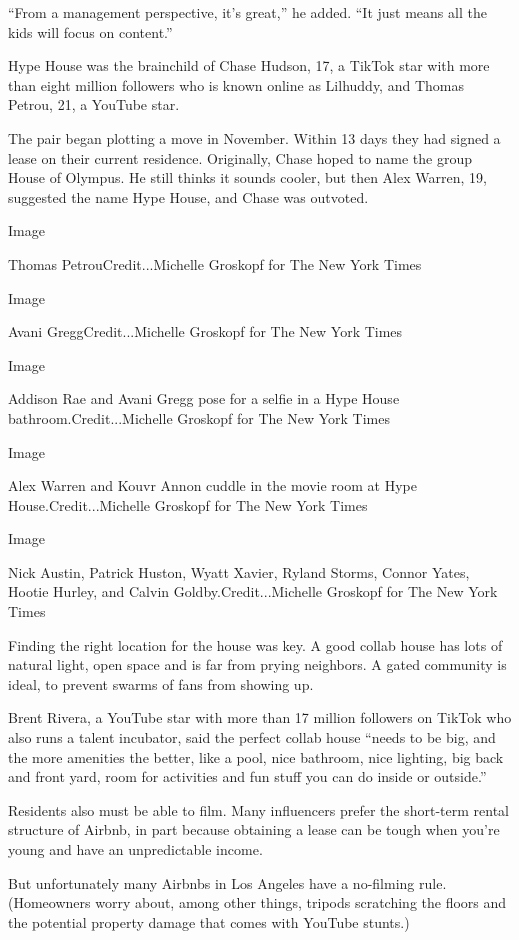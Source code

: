 ``From a management perspective, it's great,'' he added. ``It just means
all the kids will focus on content.''

Hype House was the brainchild of Chase Hudson, 17, a TikTok star with
more than eight million followers who is known online as Lilhuddy, and
Thomas Petrou, 21, a YouTube star.

The pair began plotting a move in November. Within 13 days they had
signed a lease on their current residence. Originally, Chase hoped to
name the group House of Olympus. He still thinks it sounds cooler, but
then Alex Warren, 19, suggested the name Hype House, and Chase was
outvoted.

Image

Thomas PetrouCredit...Michelle Groskopf for The New York Times

Image

Avani GreggCredit...Michelle Groskopf for The New York Times

Image

Addison Rae and Avani Gregg pose for a selfie in a Hype House
bathroom.Credit...Michelle Groskopf for The New York Times

Image

Alex Warren and Kouvr Annon cuddle in the movie room at Hype
House.Credit...Michelle Groskopf for The New York Times

Image

Nick Austin, Patrick Huston, Wyatt Xavier, Ryland Storms, Connor Yates,
Hootie Hurley, and Calvin Goldby.Credit...Michelle Groskopf for The New
York Times

Finding the right location for the house was key. A good collab house
has lots of natural light, open space and is far from prying neighbors.
A gated community is ideal, to prevent swarms of fans from showing up.

Brent Rivera, a YouTube star with more than 17 million followers on
TikTok who also runs a talent incubator, said the perfect collab house
``needs to be big, and the more amenities the better, like a pool, nice
bathroom, nice lighting, big back and front yard, room for activities
and fun stuff you can do inside or outside.''

Residents also must be able to film. Many influencers prefer the
short-term rental structure of Airbnb, in part because obtaining a lease
can be tough when you're young and have an unpredictable income.

But unfortunately many Airbnbs in Los Angeles have a no-filming rule.
(Homeowners worry about, among other things, tripods scratching the
floors and the potential property damage that comes with YouTube
stunts.)

